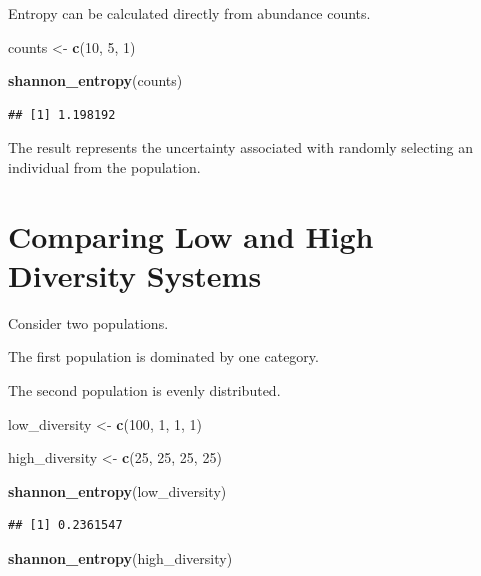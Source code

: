 \documentclass[
  oneside,
  openany]{book}
\newenvironment{Shaded}{\begin{snugshade}}{\end{snugshade}}
\newcommand{\DecValTok}[1]{\textcolor[rgb]{0.00,0.00,0.81}{#1}}
\newcommand{\FunctionTok}[1]{\textcolor[rgb]{0.13,0.29,0.53}{\textbf{#1}}}
\newcommand{\NormalTok}[1]{#1}
\newcommand{\OtherTok}[1]{\textcolor[rgb]{0.56,0.35,0.01}{#1}}
\begin{document}
Entropy can be calculated directly from abundance counts.

\begin{Shaded}
\begin{Highlighting}[]
\NormalTok{counts }\OtherTok{\textless{}{-}} \FunctionTok{c}\NormalTok{(}\DecValTok{10}\NormalTok{, }\DecValTok{5}\NormalTok{, }\DecValTok{1}\NormalTok{)}

\FunctionTok{shannon\_entropy}\NormalTok{(counts)}
\end{Highlighting}
\end{Shaded}

\begin{verbatim}
## [1] 1.198192
\end{verbatim}

The result represents the uncertainty associated with randomly selecting an individual from the population.

\section{Comparing Low and High Diversity Systems}\label{comparing-low-and-high-diversity-systems}

Consider two populations.

The first population is dominated by one category.

The second population is evenly distributed.

\begin{Shaded}
\begin{Highlighting}[]
\NormalTok{low\_diversity }\OtherTok{\textless{}{-}} \FunctionTok{c}\NormalTok{(}\DecValTok{100}\NormalTok{, }\DecValTok{1}\NormalTok{, }\DecValTok{1}\NormalTok{, }\DecValTok{1}\NormalTok{)}

\NormalTok{high\_diversity }\OtherTok{\textless{}{-}} \FunctionTok{c}\NormalTok{(}\DecValTok{25}\NormalTok{, }\DecValTok{25}\NormalTok{, }\DecValTok{25}\NormalTok{, }\DecValTok{25}\NormalTok{)}

\FunctionTok{shannon\_entropy}\NormalTok{(low\_diversity)}
\end{Highlighting}
\end{Shaded}

\begin{verbatim}
## [1] 0.2361547
\end{verbatim}

\begin{Shaded}
\begin{Highlighting}[]
\FunctionTok{shannon\_entropy}\NormalTok{(high\_diversity)}
\end{Highlighting}
\end{Shaded}
\end{document}
